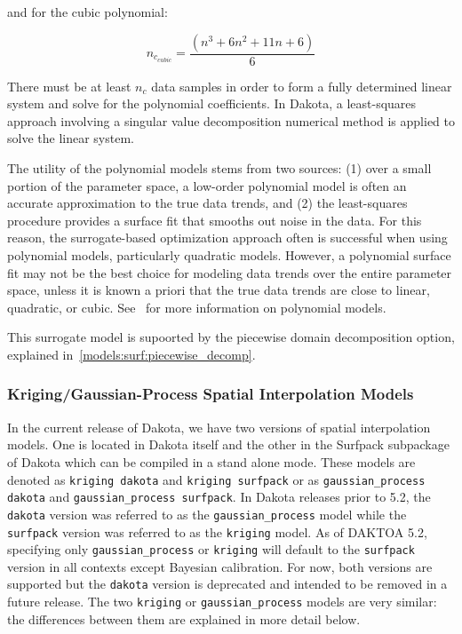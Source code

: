and for the cubic polynomial:

\begin{equation}
  n_{c_{cubic}}=\frac{(n^{3}+6 n^{2}+11 n+6)}{6}
  \label{models:surf:equation06}
\end{equation}

There must be at least $n_{c}$ data samples in order to form a fully
determined linear system and solve for the polynomial coefficients. In
Dakota, a least-squares approach involving a singular value
decomposition numerical method is applied to solve the linear system.

The utility of the polynomial models stems from two sources: (1) over
a small portion of the parameter space, a low-order polynomial model
is often an accurate approximation to the true data trends, and (2)
the least-squares procedure provides a surface fit that smooths out
noise in the data. For this reason, the surrogate-based optimization
approach often is successful when using polynomial models,
particularly quadratic models. However, a polynomial surface fit may
not be the best choice for modeling data trends over the entire
parameter space, unless it is known a priori that the true data trends
are close to linear, quadratic, or cubic. See~\cite{Mye95} for more
information on polynomial models.

This surrogate model is supoorted by the piecewise domain decomposition option, explained in~\ref{models:surf:piecewise_decomp}.

\subsubsection{Kriging/Gaussian-Process Spatial Interpolation Models}
\label{models:surf:kriging}
In the current release of Dakota, we have two versions of spatial interpolation 
models. One is located in Dakota itself and the other in the Surfpack subpackage 
of Dakota which can be compiled in a stand alone mode.  These models
are denoted as \texttt{kriging dakota} and \texttt{kriging surfpack} or 
as \texttt{gaussian\_process dakota} and 
\texttt{gaussian\_process surfpack}.  In Dakota releases prior to 5.2, the 
\texttt{dakota} version was referred to as the \texttt{gaussian\_process} 
model while the \texttt{surfpack} version was referred to as the 
\texttt{kriging} model.  As of DAKTOA 5.2, specifying only 
\texttt{gaussian\_process} or \texttt{kriging} will default to the
\texttt{surfpack} version in all contexts except Bayesian calibration.  
For now, both versions are supported but the \texttt{dakota} version is 
deprecated and intended to be removed in a future release.  The two 
\texttt{kriging} or \texttt{gaussian\_process} models are very similar: 
the differences between them are explained in more detail below.

